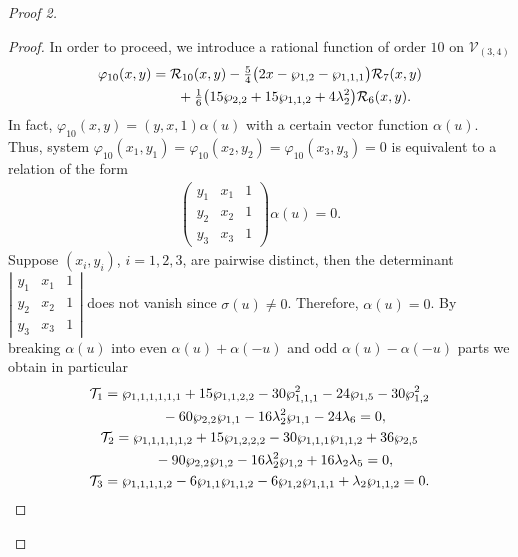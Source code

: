 \documentclass[11pt]{article}
\numberwithin{equation}{section}
\begin{document}
\begin{proof}[Proof 2]
\begin{proof}
In order to proceed, we introduce a rational function of order $10$ {on $\mathcal{V}_{(3,4)}$}
\begin{gather*}
 \varphi_{10}(x,y) = \mathcal{R}_{10}(x,y) -
 \tfrac{5}{4} \bigl(2x - \wp_{1,2} - \wp_{1,1,1}\bigr) \mathcal{R}_{7}(x,y)\\
 \hphantom{\varphi_{10}(x,y) =}{} + \tfrac{1}{6}\bigl(15 \wp_{2,2} + 15\wp_{1,1,2} + 4\lambda_2^2\bigr) \mathcal{R}_{6}(x,y).
\end{gather*}
In fact, $\varphi_{10}(x,y)=(y,x,1)\alpha(u)$ with a certain vector function $\alpha(u)$. Thus, system $\varphi_{10}(x_1,y_1)= \varphi_{10}(x_2,y_2)= \varphi_{10}(x_3,y_3)=0$ is equivalent to a relation of the form
\begin{gather*}
 \begin{pmatrix}
 y_1 & x_1 & 1 \\ y_2 & x_2 & 1\\ y_3 & x_3 & 1
 \end{pmatrix} \alpha (u) = 0.
\end{gather*}
Suppose $(x_i,y_i)$, $i=1,2,3$, are pairwise distinct, then the determinant $\left|\begin{smallmatrix} y_1 & x_1 & 1 \\ y_2 & x_2 & 1\\ y_3 & x_3 & 1 \end{smallmatrix}\right|$ does not vanish since $\sigma(u)\neq 0$. Therefore, $\alpha(u)=0$. By breaking $\alpha (u)$ into even $\alpha (u) + \alpha (-u)$ and odd $\alpha (u) - \alpha (-u)$ parts we obtain in particular
\begin{subequations}
\begin{gather}
 \mathcal{T}_1 = \wp_{1,1,1,1,1,1} + 15\wp_{1,1,2,2} - 30\wp_{1,1,1}^2 - 24\wp_{1,5} -30 \wp_{1,2}^2\nonumber\\
 \hphantom{\mathcal{T}_1 =}{} - 60\wp_{2,2}\wp_{1,1} - 16\lambda_2^2 \wp_{1,1} - 24 \lambda_6 = 0, \label{EvenRel1C34}\\
 \mathcal{T}_2 = \wp_{1,1,1,1,1,2} + 15\wp_{1,2,2,2} - 30\wp_{1,1,1}\wp_{1,1,2} + 36\wp_{2,5}\nonumber\\
 \hphantom{\mathcal{T}_2 =}{} - 90 \wp_{2,2}\wp_{1,2} - 16\lambda_2^2 \wp_{1,2} + 16 \lambda_2 \lambda_5 = 0 , \label{EvenRel2C34}\\
 \mathcal{T}_3 = \wp_{1,1,1,1,2} - 6\wp_{1,1}\wp_{1,1,2} - 6\wp_{1,2}\wp_{1,1,1} + \lambda_2 \wp_{1,1,2} = 0. \label{OddRelC34}
\end{gather}
\end{subequations}


\end{proof}
\end{proof}
\end{document}

